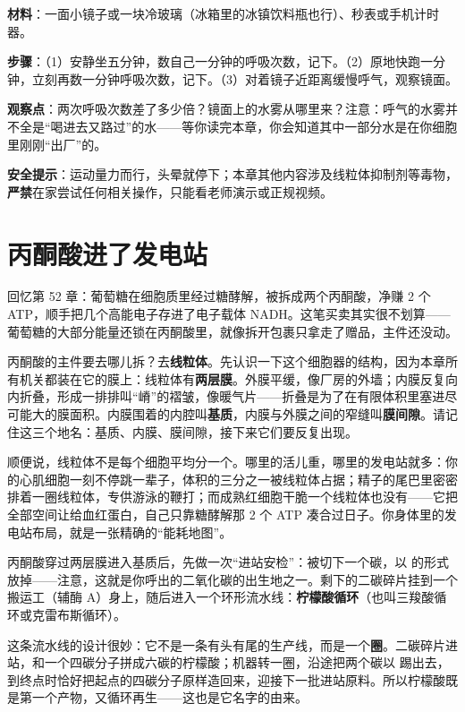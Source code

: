 \begin{shiyan}
\textbf{材料}：一面小镜子或一块冷玻璃（冰箱里的冰镇饮料瓶也行）、秒表或手机计时器。

\textbf{步骤}：（1）安静坐五分钟，数自己一分钟的呼吸次数，记下。（2）原地快跑一分钟，立刻再数一分钟呼吸次数，记下。（3）对着镜子近距离缓慢呼气，观察镜面。

\textbf{观察点}：两次呼吸次数差了多少倍？镜面上的水雾从哪里来？注意：呼气的水雾并不全是“喝进去又路过”的水——等你读完本章，你会知道其中一部分水是在你细胞里刚刚“出厂”的。

\textbf{安全提示}：运动量力而行，头晕就停下；本章其他内容涉及线粒体抑制剂等毒物，\textbf{严禁}在家尝试任何相关操作，只能看老师演示或正规视频。
\end{shiyan}

\section{丙酮酸进了发电站}

回忆第 52 章：葡萄糖在细胞质里经过糖酵解，被拆成两个丙酮酸，净赚 2 个 ATP，顺手把几个高能电子存进了电子载体 NADH。这笔买卖其实很不划算——葡萄糖的大部分能量还锁在丙酮酸里，就像拆开包裹只拿走了赠品，主件还没动。

丙酮酸的主件要去哪儿拆？去\textbf{线粒体}。先认识一下这个细胞器的结构，因为本章所有机关都装在它的膜上：线粒体有\textbf{两层膜}。外膜平缓，像厂房的外墙；内膜反复向内折叠，形成一排排叫“嵴”的褶皱，像暖气片——折叠是为了在有限体积里塞进尽可能大的膜面积。内膜围着的内腔叫\textbf{基质}，内膜与外膜之间的窄缝叫\textbf{膜间隙}。请记住这三个地名：基质、内膜、膜间隙，接下来它们要反复出现。

顺便说，线粒体不是每个细胞平均分一个。哪里的活儿重，哪里的发电站就多：你的心肌细胞一刻不停跳一辈子，体积的三分之一被线粒体占据；精子的尾巴里密密排着一圈线粒体，专供游泳的鞭打；而成熟红细胞干脆一个线粒体也没有——它把全部空间让给血红蛋白，自己只靠糖酵解那 2 个 ATP 凑合过日子。你身体里的发电站布局，就是一张精确的“能耗地图”。

丙酮酸穿过两层膜进入基质后，先做一次“进站安检”：被切下一个碳，以  的形式放掉——注意，这就是你呼出的二氧化碳的出生地之一。剩下的二碳碎片挂到一个搬运工（辅酶 A）身上，随后进入一个环形流水线：\textbf{柠檬酸循环}（也叫三羧酸循环或克雷布斯循环）。

这条流水线的设计很妙：它不是一条有头有尾的生产线，而是一个\textbf{圈}。二碳碎片进站，和一个四碳分子拼成六碳的柠檬酸；机器转一圈，沿途把两个碳以  踢出去，到终点时恰好把起点的四碳分子原样造回来，迎接下一批进站原料。所以柠檬酸既是第一个产物，又循环再生——这也是它名字的由来。

